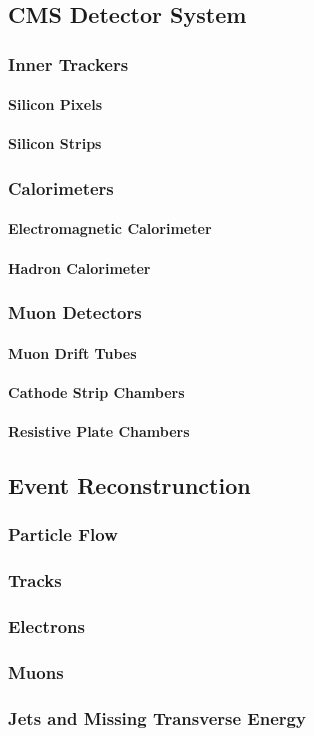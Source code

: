 \subsection{CMS Detector System}
\subsubsection{Inner Trackers}
\paragraph{Silicon Pixels}
\paragraph{Silicon Strips}

\subsubsection{Calorimeters}
\paragraph{Electromagnetic Calorimeter}
\paragraph{Hadron Calorimeter}

\subsubsection{Muon Detectors}
\paragraph{Muon Drift Tubes}
\paragraph{Cathode Strip Chambers}
\paragraph{Resistive Plate Chambers}

\subsection{Event Reconstrunction}
\subsubsection{Particle Flow}
\subsubsection{Tracks}
\subsubsection{Electrons}
\subsubsection{Muons}
\subsubsection{Jets and Missing Transverse Energy}
